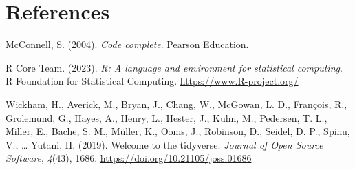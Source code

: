 \documentclass[10pt,a4paper,onecolumn]{article}
\newlength{\cslhangindent}
\newlength{\cslentryspacingunit} %
\newenvironment{CSLReferences}[2] %
 {%
  \setlength{\parindent}{0pt}
  \ifodd #1
  \let\oldpar\par
  \def\par{\hangindent=\cslhangindent\oldpar}
  \fi
  \setlength{\parskip}{#2\cslentryspacingunit}
 }%
 {}
\begin{document}
\hypertarget{references}{%
\section*{References}\label{references}}

\hypertarget{refs}{}
\begin{CSLReferences}{1}{0}
\leavevmode{}%
McConnell, S. (2004). \emph{Code complete}. Pearson Education.

\leavevmode{}%
R Core Team. (2023). \emph{{R}: A language and environment for
statistical computing}. R Foundation for Statistical Computing.
\url{https://www.R-project.org/}

\leavevmode{}%
Wickham, H., Averick, M., Bryan, J., Chang, W., McGowan, L. D.,
François, R., Grolemund, G., Hayes, A., Henry, L., Hester, J., Kuhn, M.,
Pedersen, T. L., Miller, E., Bache, S. M., Müller, K., Ooms, J.,
Robinson, D., Seidel, D. P., Spinu, V., \ldots{} Yutani, H. (2019).
Welcome to the {tidyverse}. \emph{Journal of Open Source Software},
\emph{4}(43), 1686. \url{https://doi.org/10.21105/joss.01686}

\end{CSLReferences}
\end{document}
